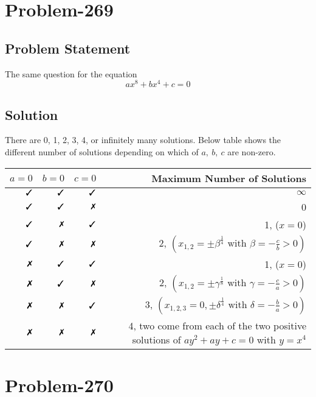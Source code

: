\documentclass[12pt]{article}
\newcommand{\cmark}{\text{\ding{51}}}
\newcommand{\xmark}{\text{\ding{55}}}
\begin{document}
\section*{Problem-269}
\subsection*{Problem Statement}
The same question for the equation
\[
	ax^8 + bx^4 + c = 0
\]

\subsection*{Solution}
There are 0, 1, 2, 3, 4, or infinitely many solutions. Below table shows the different number of solutions depending on which of $a,\ b,\ c$ are non-zero.

\begin{table}[ht]
\centering %
\begin{tabular}{| r | r | r | r |} %
\hline %
 $a = 0$ & $b = 0$ & $c = 0$ & Maximum Number of Solutions \\ %
\hline %
\hline
$\cmark$ & $\cmark$ & $\cmark$ & $\infty$ \\
\hline
$\cmark$ & $\cmark$ & $\xmark$ & 0\\
\hline
$\cmark$ & $\xmark$ & $\cmark$ & 1, ($x = 0$)\\
\hline
$\cmark$ & $\xmark$ & $\xmark$ & 2, $\left( x_{1,2} = {\pm \beta}^{\frac{1}{4}} \text{ with } \beta = -\frac{c}{b} > 0 \right)$\\
\hline
$\xmark$ & $\cmark$ & $\cmark$ & 1, ($x=0$)\\
\hline
$\xmark$ & $\cmark$ & $\xmark$ & 2, $\left( x_{1,2} = \pm \gamma^{\frac{1}{8}} \mbox{ with } \gamma = -\frac{c}{a} > 0 \right)$\\
\hline
$\xmark$ & $\xmark$ & $\cmark$ & 3, $\left( x_{1,2,3}=0, \pm \delta^{\frac{1}{4}} \mbox{ with } \delta = -\frac{b}{a} > 0 \right)$\\
\hline
$\xmark$ & $\xmark$ & $\xmark$ & \shortstack{4, two come from each of the two positive solutions of \\ $ay^2 + ay+c = 0$ with $y = x^4$}\\
\hline %
\end{tabular}
\end{table}

\section*{Problem-270}
\end{document}
